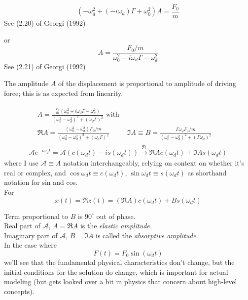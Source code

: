 \documentclass[10pt]{amsart}
\begin{document}
\begin{multicols*}{2}
\begin{equation}
	(-\omega_d^2 + (-i \omega_d)\Gamma + \omega_0^2)A = \frac{F_0}{m} 
\end{equation}
See (2.20) of Georgi (1992) \cite{Geor1992}

or
\begin{equation}\label{Eq:ForcedOscillationSteadyStateSolutionAmplitude}
	A = \frac{ F_0 / m }{ \omega_0^2 - i\omega_d \Gamma - \omega_d^2}
\end{equation}
See (2.21) of Georgi (1992) \cite{Geor1992}

The amplitude $A$ of the displacement is proportional to amplitude of driving force; this is as expected from linearity.

\[
\begin{gathered}
	\begin{aligned}
		& A = \frac{ \frac{F_0}{m} (\omega_0^2 + i \omega_d \Gamma - \omega_d^2 )}{ (\omega_0^2 - \omega_d^2)^2 + (\omega_d \Gamma)^2 } \text{ with } & \\
		& \Re{A} = \frac{ (\omega_0^2 - \omega_d^2) F_0/m }{(\omega_0^2 - \omega_d^2)^2 + (\omega_d \Gamma)^2} & \Im{A} \equiv B = \frac{ \Gamma \omega_d F_0 /m }{ (\omega_0^2 - \omega_d^2)^2 + (\Gamma \omega_d )^2 }
	\end{aligned} \\
	\mathcal{A} e^{- i\omega_d t} = \mathcal{A} ( c(\omega_dt) - i s(\omega_dt)) \xrightarrow{\Re} \Re{A } c(\omega_d t) + \Im{A} s(\omega_d t)
\end{gathered}
\]
where I use $\mathcal{A} \equiv A$ notation interchangeably, relying on context on whether it's real or complex, and $\cos{\omega_d t} \equiv c(\omega_d t)$, $\sin{\omega_d t} \equiv s(\omega_d t)$ as shorthand notation for sin and cos. \\

For 
\[
x(t) = \Re{z(t)} = (\Re{A}) c(\omega_d t) + Bs(\omega_d t)
\]

Term proportional to $B$ is $90^{\circ}$ out of phase. \\
Real part of $\mathcal{A}$, $A = \Re{A}$ is the \emph{elastic amplitude.} \\
Imaginary part of $\mathcal{A}$, $B = \Im{A}$ is called the \emph{absorptive amplitude}. \\

In the case where 
\[
F(t) = F_0 \sin{(\omega_dt)}
\]
we'll see that the fundamental physical characteristics don't change, but the initial conditions for the solution do change, which is important for actual modeling (but gets looked over a bit in physics that concern about high-level concepts).


\end{multicols*}
\end{document}
